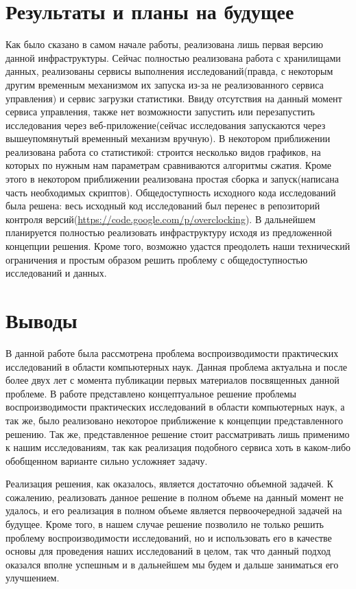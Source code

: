 \documentclass[12pt,a4paper]{extarticle}
\begin{document}
\newpage
\section{Результаты и планы на будущее}
Как было сказано в самом начале работы, реализована лишь первая версию данной инфраструктуры. Сейчас полностью реализована работа с хранилищами данных, реализованы сервисы выполнения исследований(правда, с некоторым другим временным механизмом их запуска из-за не реализованного сервиса управления) и сервис загрузки статистики. Ввиду отсутствия на данный момент сервиса управления, также нет возможности запустить или перезапустить исследования через веб-приложение(сейчас исследования запускаются через вышеупомянутый временный механизм вручную). В некотором приближении реализована работа со статистикой: строится несколько видов графиков, на которых по нужным нам параметрам сравниваются алгоритмы сжатия. Кроме этого в некотором приближении реализована простая сборка и запуск(написана часть необходимых скриптов). Общедоступность исходного кода исследований была решена: весь исходный код исследований был перенес в репозиторий контроля версий(\url{https://code.google.com/p/overclocking}). В дальнейшем планируется полностью реализовать инфраструктуру исходя из предложенной концепции решения. Кроме того, возможно удастся преодолеть наши технический ограничения и простым образом решить проблему с общедоступностью исследований и данных.

\newpage
\section{Выводы}
В данной работе была рассмотрена проблема воспроизводимости практических исследований в области компьютерных наук. Данная проблема актуальна и после более двух лет с момента публикации первых материалов посвященных данной проблеме. В работе представлено концептуальное решение проблемы воспроизводимости практических исследований в области компьютерных наук, а так же, было реализовано некоторое приближение к концепции представленного решению. Так же, представленное решение стоит рассматривать лишь применимо к нашим исследованиям, так как реализация подобного сервиса хоть в каком-либо обобщенном варианте сильно усложняет задачу.

Реализация решения, как оказалось, является достаточно объемной задачей. К сожалению, реализовать данное решение в полном объеме на данный момент не удалось, и его реализация в полном объеме является первоочередной задачей на будущее. Кроме того, в нашем случае решение позволило не только решить проблему воспроизводимости исследований, но и использовать его в качестве основы для проведения наших исследований в целом, так что данный подход оказался вполне успешным и в дальнейшем мы будем и дальше заниматься его улучшением.
\end{document}
